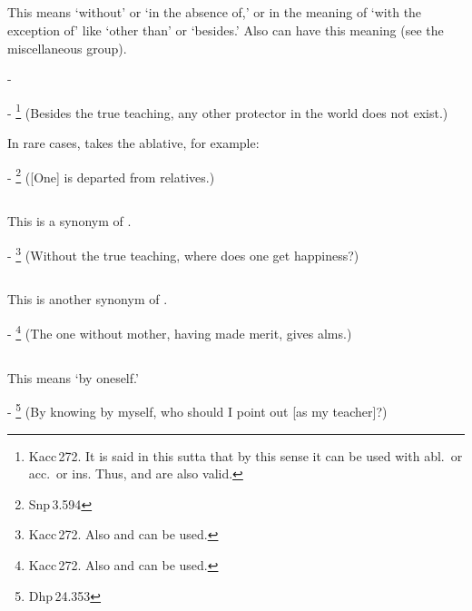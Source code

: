 \subsection*{}\label{nip:vinaa}
This means `without' or `in the absence of,' or in the meaning of `with the exception of' like `other than' or `besides.' Also  can have this meaning (see the miscellaneous group).\par
-  \par
- \footnote{Kacc\,272. It is said in this sutta that by this sense it can be used with abl.\ or acc.\ or ins. Thus,  and  are also valid.} (Besides the true teaching, any other protector in the world does not exist.) \par
In rare cases,  takes the ablative, for example:\par
- \footnote{Snp\,3.594} ([One] is departed from relatives.)\par

\subsection*{}\label{nip:rite}
This is a synonym of .\par
- \footnote{Kacc\,272. Also  and  can be used.} (Without the true teaching, where does one get happiness?) \par

\subsection*{}\label{nip:rahitaa}
This is another synonym of .\par
- \footnote{Kacc\,272. Also  and  can be used.} (The one without mother, having made merit, gives alms.) \par

\subsection*{}\label{nip:sayadm}
This means `by oneself.'\par
- \footnote{Dhp\,24.353} (By knowing by myself, who should I point out [as my teacher]?) \par

